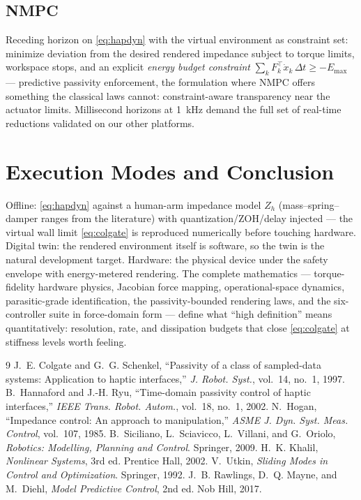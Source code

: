 \documentclass[conference]{IEEEtran}
\begin{document}
\subsection{NMPC}
Receding horizon on \eqref{eq:hapdyn} with the virtual environment as constraint set: minimize deviation from the desired rendered impedance subject to torque limits, workspace stops, and an explicit \emph{energy budget constraint} $\sum_k F_k^{\!\top}\dot x_k\,\Delta t \ge -E_{\mathrm{max}}$ --- predictive passivity enforcement, the formulation where NMPC offers something the classical laws cannot: constraint-aware transparency near the actuator limits. Millisecond horizons at 1~kHz demand the full set of real-time reductions validated on our other platforms.

\section{Execution Modes and Conclusion}
Offline: \eqref{eq:hapdyn} against a human-arm impedance model $Z_h$ (mass--spring--damper ranges from the literature) with quantization/ZOH/delay injected --- the virtual wall limit \eqref{eq:colgate} is reproduced numerically before touching hardware. Digital twin: the rendered environment itself is software, so the twin is the natural development target. Hardware: the physical device under the safety envelope with energy-metered rendering. The complete mathematics --- torque-fidelity hardware physics, Jacobian force mapping, operational-space dynamics, parasitic-grade identification, the passivity-bounded rendering laws, and the six-controller suite in force-domain form --- define what ``high definition'' means quantitatively: resolution, rate, and dissipation budgets that close \eqref{eq:colgate} at stiffness levels worth feeling.


\begin{thebibliography}{9}
 J.~E. Colgate and G.~G. Schenkel, ``Passivity of a class of sampled-data systems: Application to haptic interfaces,'' \emph{J. Robot. Syst.}, vol.~14, no.~1, 1997.
 B.~Hannaford and J.-H. Ryu, ``Time-domain passivity control of haptic interfaces,'' \emph{IEEE Trans. Robot. Autom.}, vol.~18, no.~1, 2002.
 N.~Hogan, ``Impedance control: An approach to manipulation,'' \emph{ASME J. Dyn. Syst. Meas. Control}, vol.~107, 1985.
 B.~Siciliano, L.~Sciavicco, L.~Villani, and G.~Oriolo, \emph{Robotics: Modelling, Planning and Control}. Springer, 2009.
 H.~K. Khalil, \emph{Nonlinear Systems}, 3rd ed. Prentice Hall, 2002.
 V.~Utkin, \emph{Sliding Modes in Control and Optimization}. Springer, 1992.
 J.~B. Rawlings, D.~Q. Mayne, and M.~Diehl, \emph{Model Predictive Control}, 2nd ed. Nob Hill, 2017.
\end{thebibliography}
\end{document}

